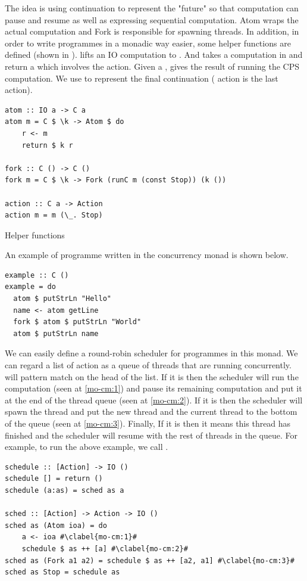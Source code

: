 The idea is using continuation to represent the "future" so that computation can pause and resume as well as expressing sequential computation. Atom wraps the actual computation and Fork is responsible for spawning threads. In addition, in order to write programmes in a monadic way easier, some helper functions are defined (shown in ).  lifts an IO computation to . And  takes a computation in  and return a  which involves the  action. Given a ,  gives the result of running the CPS computation. We use  to represent the final continuation ( action is the last action). 
\begin{code}
\begin{verbatim}
atom :: IO a -> C a
atom m = C $ \k -> Atom $ do
    r <- m
    return $ k r

fork :: C () -> C ()
fork m = C $ \k -> Fork (runC m (const Stop)) (k ())

action :: C a -> Action
action m = m (\_. Stop)
\end{verbatim}
\caption{Helper functions}
\label{b:mo:helper}
\end{code}
An example of programme written in the concurrency monad is shown below.
\begin{code}
  \begin{verbatim}
example :: C ()
example = do 
  atom $ putStrLn "Hello" 
  name <- atom getLine 
  fork $ atom $ putStrLn "World"
  atom $ putStrLn name
  \end{verbatim}
\end{code}
We can easily define a round-robin scheduler for programmes in this monad. We can regard a list of action as a queue of threads that are running concurrently.  will pattern match on the head of the list. If it is  then the scheduler will run the computation (seen  at \cref{mo-cm:1}) and pause its remaining computation and put it at the end of the thread queue (seen at \cref{mo-cm:2}). If it is  then the scheduler will spawn the thread and put the new thread and the current thread to the bottom of the queue (seen at \cref{mo-cm:3}). Finally, If it is  then it means this thread has finished and the scheduler will resume with the rest of threads in the queue. For example, to run the above example, we call .
\begin{code}
  \begin{verbatim}
schedule :: [Action] -> IO () 
schedule [] = return ()
schedule (a:as) = sched as a

sched :: [Action] -> Action -> IO ()
sched as (Atom ioa) = do
    a <- ioa #\clabel{mo-cm:1}#
    schedule $ as ++ [a] #\clabel{mo-cm:2}#
sched as (Fork a1 a2) = schedule $ as ++ [a2, a1] #\clabel{mo-cm:3}#
sched as Stop = schedule as
  \end{verbatim}
\end{code}

